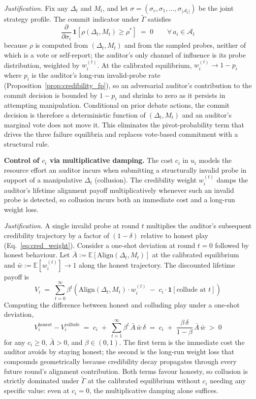 \textit{Justification.}
Fix any $\Delta_t$ and $M_t$, and let
$\sigma=(\sigma_c, \sigma_1, \dots, \sigma_{|\mathcal{A}_t|})$ be the
joint strategy profile. The commit indicator under $\widetilde\Gamma$
satisfies
\[
\frac{\partial}{\partial \sigma_i} \,\mathbf{1}[\rho(\Delta_t,M_t)\geq\rho^*] \;=\; 0
\qquad\forall\, a_i\in\mathcal{A}_t
\]
because $\rho$ is computed from $(\Delta_t,M_t)$ and from the sampled
probes, neither of which is a vote or self-report; the auditor's only
channel of influence is its probe distribution, weighted by
$w_i^{(t)}$. At the calibrated equilibrium, $w_i^{(t)} \to 1 - p_i$
where $p_i$ is the auditor's long-run invalid-probe rate
(Proposition~\ref{prop:credibility_fp}), so an adversarial auditor's
contribution to the commit decision is bounded by $1 - p_i$ and shrinks
to zero as it persists in attempting manipulation. Conditional on prior
debate actions, the commit decision is therefore a deterministic
function of $(\Delta_t,M_t)$ and an auditor's marginal vote does not
move it. This eliminates the pivot-probability term that drives the
three failure equilibria and replaces vote-based commitment with a
structural rule.

\textbf{Control of $c_i$ via multiplicative damping.}
The cost $c_i$ in $u_i$ models the resource effort an auditor incurs
when submitting a structurally invalid probe in support of a manipulative
$\Delta_t$ (collusion). The credibility weight $w_i^{(t)}$ damps the
auditor's lifetime alignment payoff multiplicatively whenever such an
invalid probe is detected, so collusion incurs both an immediate cost
and a long-run weight loss.

\textit{Justification.}
A single invalid probe at round $t$ multiplies the auditor's
subsequent credibility trajectory by a factor of $(1-\delta)$ relative
to honest play (Eq.~\ref{eq:cred_weight}). Consider a one-shot
deviation at round $t=0$ followed by honest behaviour. Let
$\bar A := \mathbb{E}[\mathrm{Align}(\Delta_t,M_t)]$ at the calibrated
equilibrium and $\bar w := \mathbb{E}[w_i^{(t)}]\to 1$ along the honest
trajectory. The discounted lifetime payoff is
\[
V_i \;=\; \sum_{t=0}^{\infty}\beta^t\!\left(\mathrm{Align}(\Delta_t,M_t)\cdot w_i^{(t)}\;-\;c_i\cdot\mathbf{1}[\text{collude at }t]\right)
\]
Computing the difference between honest and colluding play under a
one-shot deviation,
\[
V_i^{\text{honest}}-V_i^{\text{collude}} \;=\; c_i \;+\; \sum_{t=1}^{\infty}\beta^t\,\bar A\,\bar w\,\delta
\;=\; c_i \;+\; \frac{\beta\,\delta}{1-\beta}\,\bar A\,\bar w \;>\; 0
\]
for any $c_i\geq 0$, $\bar A>0$, and $\beta\in(0,1)$. The first term is
the immediate cost the auditor avoids by staying honest; the second is
the long-run weight loss that compounds geometrically because
credibility decay propagates through every future round's alignment
contribution. Both terms favour honesty, so collusion is strictly
dominated under $\widetilde\Gamma$ at the calibrated equilibrium without $c_i$ needing any specific value: even at $c_i=0$, the
multiplicative damping alone suffices.

